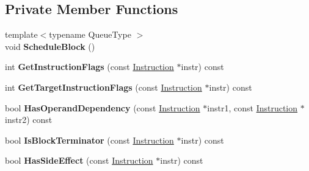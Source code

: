 \subsection*{Private Member Functions}
\begin{DoxyCompactItemize}
\item 
{\footnotesize template$<$typename Queue\+Type $>$ }\\void {\bfseries Schedule\+Block} ()\hypertarget{classv8_1_1internal_1_1compiler_1_1_instruction_scheduler_aed7e22243f10c1eb6435ca6eb36f37c8}{}\label{classv8_1_1internal_1_1compiler_1_1_instruction_scheduler_aed7e22243f10c1eb6435ca6eb36f37c8}

\item 
int {\bfseries Get\+Instruction\+Flags} (const \hyperlink{classv8_1_1internal_1_1compiler_1_1_instruction}{Instruction} $\ast$instr) const \hypertarget{classv8_1_1internal_1_1compiler_1_1_instruction_scheduler_aa83f869a07994207bfbb142b4c1d7fb3}{}\label{classv8_1_1internal_1_1compiler_1_1_instruction_scheduler_aa83f869a07994207bfbb142b4c1d7fb3}

\item 
int {\bfseries Get\+Target\+Instruction\+Flags} (const \hyperlink{classv8_1_1internal_1_1compiler_1_1_instruction}{Instruction} $\ast$instr) const \hypertarget{classv8_1_1internal_1_1compiler_1_1_instruction_scheduler_aa9a67cc62074d2f9d0f3294c038dfbb2}{}\label{classv8_1_1internal_1_1compiler_1_1_instruction_scheduler_aa9a67cc62074d2f9d0f3294c038dfbb2}

\item 
bool {\bfseries Has\+Operand\+Dependency} (const \hyperlink{classv8_1_1internal_1_1compiler_1_1_instruction}{Instruction} $\ast$instr1, const \hyperlink{classv8_1_1internal_1_1compiler_1_1_instruction}{Instruction} $\ast$instr2) const \hypertarget{classv8_1_1internal_1_1compiler_1_1_instruction_scheduler_a4b05875d4fc5ce0b73fad3a633977112}{}\label{classv8_1_1internal_1_1compiler_1_1_instruction_scheduler_a4b05875d4fc5ce0b73fad3a633977112}

\item 
bool {\bfseries Is\+Block\+Terminator} (const \hyperlink{classv8_1_1internal_1_1compiler_1_1_instruction}{Instruction} $\ast$instr) const \hypertarget{classv8_1_1internal_1_1compiler_1_1_instruction_scheduler_a10ecfe56bd7eb4153706f4be90a19399}{}\label{classv8_1_1internal_1_1compiler_1_1_instruction_scheduler_a10ecfe56bd7eb4153706f4be90a19399}

\item 
bool {\bfseries Has\+Side\+Effect} (const \hyperlink{classv8_1_1internal_1_1compiler_1_1_instruction}{Instruction} $\ast$instr) const \hypertarget{classv8_1_1internal_1_1compiler_1_1_instruction_scheduler_a8ea9ab2ea51d64a84cea748d0021bd7d}{}\label{classv8_1_1internal_1_1compiler_1_1_instruction_scheduler_a8ea9ab2ea51d64a84cea748d0021bd7d}


\end{DoxyCompactItemize}
